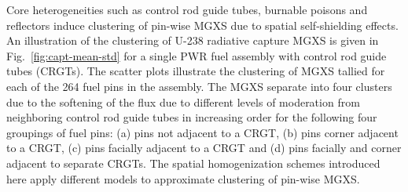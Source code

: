 \documentclass[12pt,twoside]{mitthesis-exec}
\begin{document}
Core heterogeneities such as control rod guide tubes, burnable poisons and reflectors induce clustering of pin-wise MGXS due to spatial self-shielding effects. An illustration of the clustering of U-238 radiative capture MGXS is given in Fig.~\ref{fig:capt-mean-std} for a single PWR fuel assembly with control rod guide tubes (CRGTs). The scatter plots illustrate the clustering of MGXS tallied for each of the 264 fuel pins in the assembly. The MGXS separate into four clusters due to the softening of the flux due to different levels of moderation from neighboring control rod guide tubes in increasing order for the following four groupings of fuel pins: (a) pins not adjacent to a CRGT, (b) pins corner adjacent to a CRGT, (c) pins facially adjacent to a CRGT and (d) pins facially and corner adjacent to separate CRGTs. The spatial homogenization schemes introduced here apply different models to approximate clustering of pin-wise MGXS.

\end{document}
